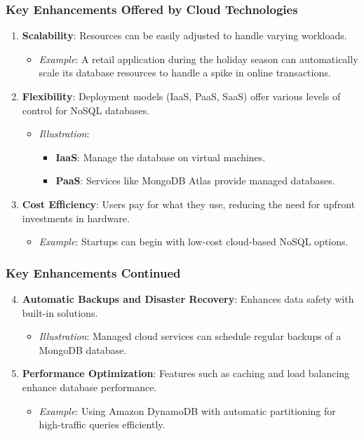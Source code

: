\documentclass[aspectratio=169]{beamer}
\begin{document}
\begin{frame}
    \frametitle{Key Enhancements Offered by Cloud Technologies}
    \begin{enumerate}
        \item \textbf{Scalability}: Resources can be easily adjusted to handle varying workloads.
            \begin{itemize}
                \item \textit{Example}: A retail application during the holiday season can automatically scale its database resources to handle a spike in online transactions.
            \end{itemize}
        \item \textbf{Flexibility}: Deployment models (IaaS, PaaS, SaaS) offer various levels of control for NoSQL databases.
            \begin{itemize}
                \item \textit{Illustration}:
                \begin{itemize}
                    \item \textbf{IaaS}: Manage the database on virtual machines.
                    \item \textbf{PaaS}: Services like MongoDB Atlas provide managed databases.
                \end{itemize}
            \end{itemize}
        \item \textbf{Cost Efficiency}: Users pay for what they use, reducing the need for upfront investments in hardware.
            \begin{itemize}
                \item \textit{Example}: Startups can begin with low-cost cloud-based NoSQL options.
            \end{itemize}
    \end{enumerate}
\end{frame}

\begin{frame}
    \frametitle{Key Enhancements Continued}
    \begin{enumerate}
        \setcounter{enumi}{3} %
        \item \textbf{Automatic Backups and Disaster Recovery}: Enhances data safety with built-in solutions.
            \begin{itemize}
                \item \textit{Illustration}: Managed cloud services can schedule regular backups of a MongoDB database.
            \end{itemize}
        \item \textbf{Performance Optimization}: Features such as caching and load balancing enhance database performance.
            \begin{itemize}
                \item \textit{Example}: Using Amazon DynamoDB with automatic partitioning for high-traffic queries efficiently.
            \end{itemize}
    \end{enumerate}
\end{frame}
\end{document}
